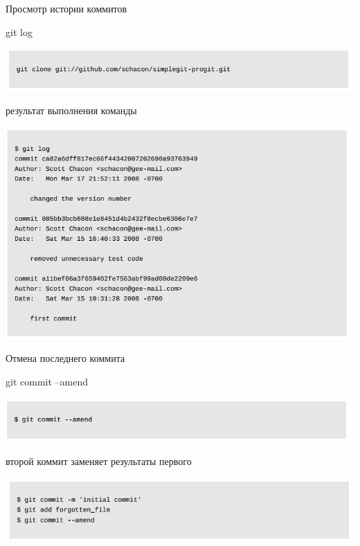 \documentclass{beamer}
\begin{document}
\begin{frame}{Просмотр истории коммитов}
\begin{block}{git log}
\begin{center}
\includegraphics[scale=0.5]{images/log-1.png}
\end{center}
\end{block}
\begin{block}{результат выполнения команды}
\begin{center}
\includegraphics[scale=0.5]{images/log-2.png}
\end{center}
\end{block}
\end{frame}

\begin{frame}{Отмена последнего коммита}
\begin{block}{git commit --amend}
\begin{center}
\includegraphics[scale=0.5]{images/ammed-1.png}
\end{center}
\end{block}
\begin{block}{второй коммит заменяет результаты первого}
\begin{center}
\includegraphics[scale=0.5]{images/ammed-2.png}
\end{center}
\end{block}
\end{frame}
\end{document}
